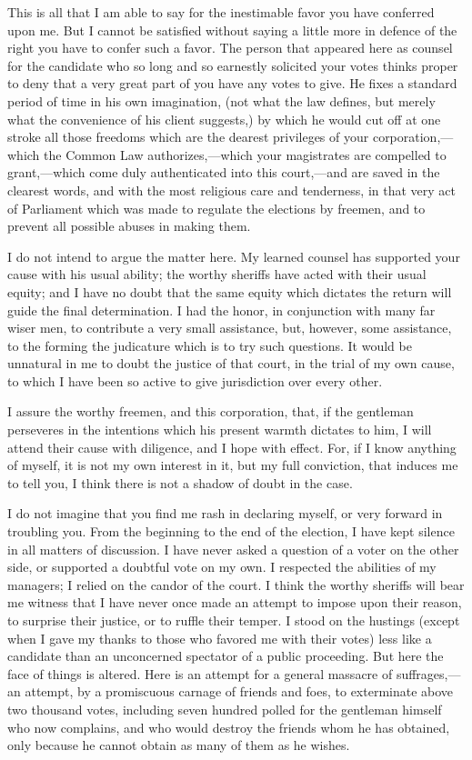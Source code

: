 This is all that I am able to say for the inestimable favor you have conferred upon me. But I cannot be satisfied without saying a little more in defence of the right you have to confer such a favor. The person that appeared here as counsel for the candidate who so long and so earnestly solicited your votes thinks proper to deny that a very great part of you have any votes to give. He fixes a standard period of time in his own imagination, (not what the law defines, but merely what the convenience of his client suggests,) by which he would cut off at one stroke all those freedoms which are the dearest privileges of your corporation,—which the Common Law authorizes,—which your magistrates are compelled to grant,—which come duly authenticated into this court,—and are saved in the clearest words, and with the most religious care and tenderness, in that very act of Parliament which was made to regulate the elections by freemen, and to prevent all possible abuses in making them.

I do not intend to argue the matter here. My learned counsel has supported your cause with his usual ability; the worthy sheriffs have acted with their usual equity; and I have no doubt that the same equity which dictates the return will guide the final determination. I had the honor, in conjunction with many far wiser men, to contribute a very small assistance, but, however, some assistance, to the forming the judicature which is to try such questions. It would be unnatural in me to doubt the justice of that court, in the trial of my own cause, to which I have been so active to give jurisdiction over every other.

I assure the worthy freemen, and this corporation, that, if the gentleman perseveres in the intentions which his present warmth dictates to him, I will attend their cause with diligence, and I hope with effect. For, if I know anything of myself, it is not my own interest in it, but my full conviction, that induces me to tell you, I think there is not a shadow of doubt in the case.

I do not imagine that you find me rash in declaring myself, or very forward in troubling you. From the beginning to the end of the election, I have kept silence in all matters of discussion. I have never asked a question of a voter on the other side, or supported a doubtful vote on my own. I respected the abilities of my managers; I relied on the candor of the court. I think the worthy sheriffs will bear me witness that I have never once made an attempt to impose upon their reason, to surprise their justice, or to ruffle their temper. I stood on the hustings (except when I gave my thanks to those who favored me with their votes) less like a candidate than an unconcerned spectator of a public proceeding. But here the face of things is altered. Here is an attempt for a general massacre of suffrages,—an attempt, by a promiscuous carnage of friends and foes, to exterminate above two thousand votes, including seven hundred polled for the gentleman himself who now complains, and who would destroy the friends whom he has obtained, only because he cannot obtain as many of them as he wishes.

